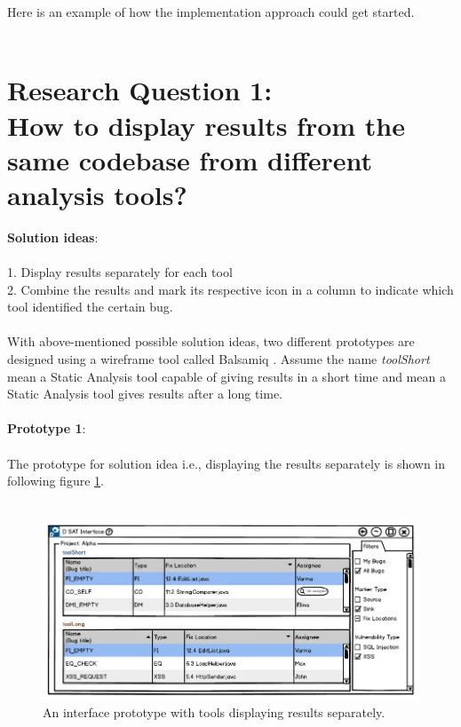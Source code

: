 Here is an example of how the implementation approach could get started. \\ \\

\section{Research Question 1: \\ How to display results from the same codebase from different analysis tools?} 


\textbf{Solution ideas}: \\ \\
1. Display results separately for each tool \\
2. Combine the results and mark its respective icon in a column to indicate which tool identified the certain bug. \\ \\

With above-mentioned possible solution ideas, two different prototypes are designed using a wireframe tool called Balsamiq \cite{B}. Assume the name \textit{toolShort} mean a Static Analysis tool capable of giving results in a short time and  mean a Static Analysis tool gives results after a long time. \\ \\

\textbf{Prototype 1}: \\ \\

The prototype for solution idea i.e., displaying the results separately is shown in following figure \ref{fig:toolSeperate}. \\ \\

\begin{figure}[hbt!]
	\centering
	\includegraphics[width=\linewidth]{figures/d_seperate}
	\caption{An interface prototype with tools displaying results separately.}
	\label{fig:toolSeperate}
\end{figure}
\newpage

